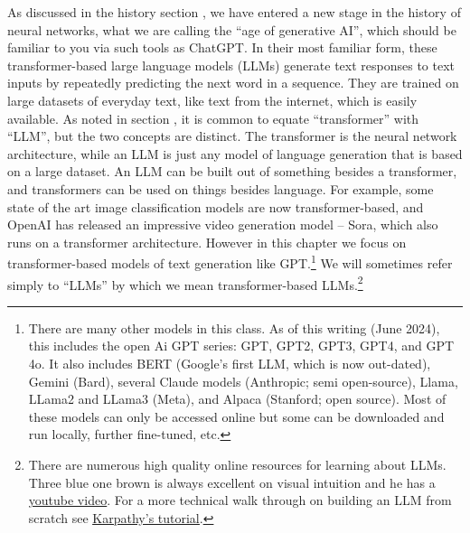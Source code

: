 As discussed in the history section , we have entered a new stage in the history of neural networks, what we are calling the ``age of generative AI'', which should be familiar to you via such tools as ChatGPT.  In their most familiar form, these transformer-based large language models (LLMs) generate text responses to text inputs by repeatedly predicting the next word in a sequence. They are trained on large datasets of everyday text, like text from the internet, which is easily available. As noted in section , it is common to equate ``transformer'' with ``LLM'', but the two concepts are distinct. The transformer is the neural network architecture, while an LLM is just any model of language generation that is based on a large dataset. An LLM can be built out of something besides a transformer, and transformers can be used on things besides language. For example, some state of the art image classification models are now transformer-based, and OpenAI has released an impressive video generation model – Sora, which also runs on a transformer architecture. However in this chapter we focus on transformer-based models of text generation like GPT.\footnote{There are many other models in this class. As of this writing (June 2024), this includes the open Ai GPT series: GPT, GPT2, GPT3, GPT4, and GPT 4o.  It also includes BERT (Google’s first LLM, which is now out-dated), Gemini (Bard), several Claude models (Anthropic;  semi open-source), Llama, LLama2 and LLama3 (Meta), and Alpaca (Stanford; open source). Most of these models can only be accessed online but some can be downloaded and run locally, further fine-tuned, etc.} We will sometimes refer simply to ``LLMs'' by which we mean transformer-based LLMs.\footnote{There are numerous high quality online resources for learning about LLMs. Three blue one brown is always excellent on visual intuition and he has a \href{https://www.youtube.com/watch?v=wjZofJX0v4M&list=PLZHQObOWTQDNU6R1_67000Dx_ZCJB-3pi}{\underline{youtube video}}.  For a more technical walk through on building an LLM from scratch see \href{https://www.youtube.com/watch?v=kCc8FmEb1nY}{\underline{Karpathy's tutorial}}.}

